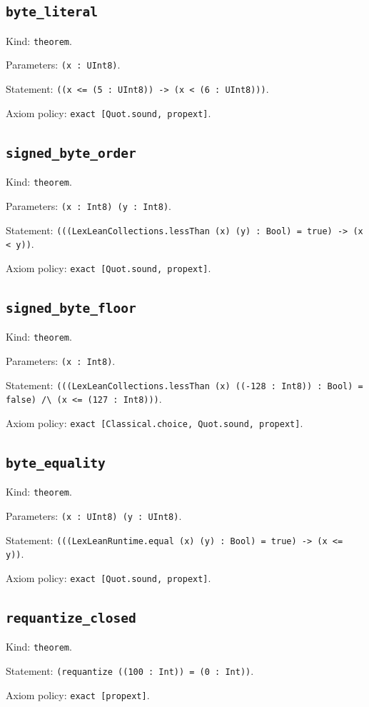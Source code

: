 \documentclass[11pt]{article}
\begin{document}
\subsection*{\texttt{byte\_literal}}
\noindent Kind: \texttt{theorem}.\par
\noindent Parameters: \texttt{(x : UInt8)}.\par
\noindent Statement: \texttt{((x <= (5 : UInt8)) -> (x < (6 : UInt8)))}.\par
\noindent Axiom policy: \texttt{exact [Quot.sound, propext]}.\par
\subsection*{\texttt{signed\_byte\_order}}
\noindent Kind: \texttt{theorem}.\par
\noindent Parameters: \texttt{(x : Int8) (y : Int8)}.\par
\noindent Statement: \texttt{(((LexLeanCollections.lessThan (x) (y) : Bool) = true) -> (x < y))}.\par
\noindent Axiom policy: \texttt{exact [Quot.sound, propext]}.\par
\subsection*{\texttt{signed\_byte\_floor}}
\noindent Kind: \texttt{theorem}.\par
\noindent Parameters: \texttt{(x : Int8)}.\par
\noindent Statement: \texttt{(((LexLeanCollections.lessThan (x) ((-128 : Int8)) : Bool) = false) /\textbackslash{} (x <= (127 : Int8)))}.\par
\noindent Axiom policy: \texttt{exact [Classical.choice, Quot.sound, propext]}.\par
\subsection*{\texttt{byte\_equality}}
\noindent Kind: \texttt{theorem}.\par
\noindent Parameters: \texttt{(x : UInt8) (y : UInt8)}.\par
\noindent Statement: \texttt{(((LexLeanRuntime.equal (x) (y) : Bool) = true) -> (x <= y))}.\par
\noindent Axiom policy: \texttt{exact [Quot.sound, propext]}.\par
\subsection*{\texttt{requantize\_closed}}
\noindent Kind: \texttt{theorem}.\par
\noindent Statement: \texttt{(requantize ((100 : Int)) = (0 : Int))}.\par
\noindent Axiom policy: \texttt{exact [propext]}.\par
\end{document}

